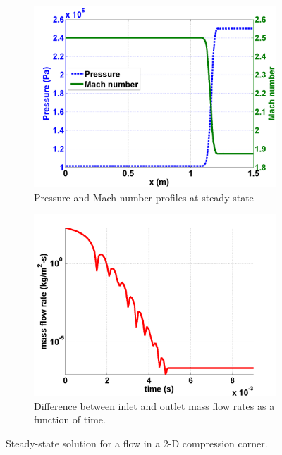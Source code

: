 \documentclass[preprint,10pt]{elsarticle}
\begin{document}
\begin{figure}[H]
        \begin{subfigure}[b]{0.49\textwidth}
                \centering
                \includegraphics[width=\textwidth]{mach_number_pressure.png}
                \caption{Pressure and Mach number profiles at steady-state}
                \label{fig:2d_corner_isomach}
        \end{subfigure}        
        \begin{subfigure}[b]{0.49\textwidth}
                \centering
                \includegraphics[width=\textwidth]{CompressionCorner2DQ.png}
                \caption{Difference between inlet and outlet mass flow rates as a function of time.}
                \label{fig:2d_convergence}
        \end{subfigure}
        \caption{Steady-state solution for a flow in a 2-D compression corner.}\label{fig:2d_corner}
\end{figure}
\end{document}
